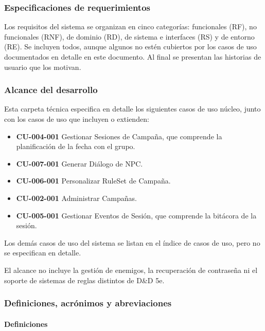 \subsubsection{Especificaciones de requerimientos}
Los requisitos del sistema se organizan en cinco categorías: funcionales (RF), no funcionales (RNF), de dominio (RD), de sistema e interfaces (RS) y de entorno (RE). Se incluyen todos, aunque algunos no estén cubiertos por los casos de uso documentados en detalle en este documento. Al final se presentan las historias de usuario que los motivan.

\subsubsection{Alcance del desarrollo}
Esta carpeta técnica especifica en detalle los siguientes casos de uso núcleo, junto con los casos de uso que incluyen o extienden:
\begin{itemize}
  \item \textbf{CU-004-001} Gestionar Sesiones de Campaña, que comprende la planificación de la fecha con el grupo.
  \item \textbf{CU-007-001} Generar Diálogo de NPC.
  \item \textbf{CU-006-001} Personalizar RuleSet de Campaña.
  \item \textbf{CU-002-001} Administrar Campañas.
  \item \textbf{CU-005-001} Gestionar Eventos de Sesión, que comprende la bitácora de la sesión.
\end{itemize}
Los demás casos de uso del sistema se listan en el índice de casos de uso, pero no se especifican en detalle.

El alcance no incluye la gestión de enemigos, la recuperación de contraseña ni el soporte de sistemas de reglas distintos de D\&D 5e.

\subsubsection{Definiciones, acrónimos y abreviaciones}
\paragraph{Definiciones}


